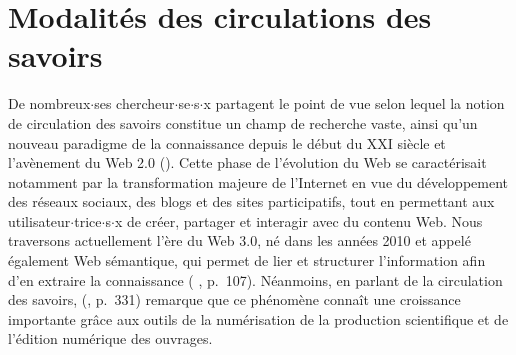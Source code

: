 \label{sota}
\minitoc
\section{Modalités des circulations des savoirs}
De nombreux$\cdot$ses chercheur$\cdot$se$\cdot$s$\cdot$x partagent le point de vue selon lequel la notion de circulation des savoirs constitue un champ de recherche vaste, ainsi qu'un nouveau paradigme de la connaissance depuis le début du XXI\ieme{} siècle et l'avènement du Web \textsc{2.0} (\citealp{landais2014frederic,quet2014frederic}). Cette phase de l'évolution du Web se caractérisait notamment par la transformation majeure de l'Internet en vue du développement des réseaux sociaux, des blogs et des sites participatifs, tout en permettant aux utilisateur$\cdot$trice$\cdot$s$\cdot$x de créer, partager et interagir avec du contenu Web. Nous traversons actuellement l'ère du Web \textsc{3.0}, né dans les années 2010 et appelé également \og{}Web sémantique\fg{}, qui permet de lier et structurer l'information afin d'en extraire la connaissance (\citeauthor{andrade2013sociologie} \citeyear{andrade2013sociologie}, p.~107). Néanmoins, en parlant de la circulation des savoirs, \citeauthor{landais2014frederic} (\citeyear{landais2014frederic}, p.~331) remarque que ce phénomène connaît une croissance importante grâce aux outils de la numérisation de la production scientifique et de l'édition numérique des ouvrages.

